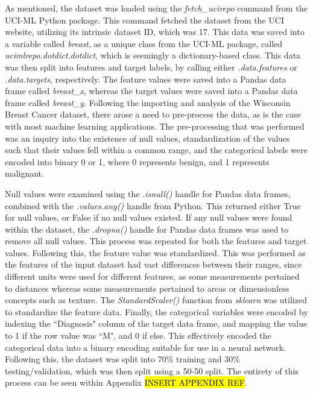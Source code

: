 \documentclass[a4paper]{article}
\begin{document}
As mentioned, the dataset was loaded using the \textit{fetch\_ucirepo} command from the UCI-ML Python package. This command fetched the dataset from the UCI website, utilizing its intrinsic dataset ID, which was 17. This data was saved into a variable called \textit{breast}, as a unique class from the UCI-ML package, called \textit{ucimlrepo.dotdict.dotdict}, which is seemingly a dictionary-based class. This data was then split into features and target labels, by calling either \textit{.data.features} or \textit{.data.targets}, respectively. The feature values were saved into a Pandas data frame called \textit{breast\_x}, whereas the target values were saved into a Pandas data frame called \textit{breast\_y}. Following the importing and analysis of the Wisconsin Breast Cancer dataset, there arose a need to pre-process the data, as is the case with most machine learning applications. The pre-processing that was performed was an inquiry into the existence of null values, standardization of the values such that their values fell within a common range, and the categorical labels were encoded into binary 0 or 1, where 0 represents benign, and 1 represents malignant. 

Null values were examined using the \textit{.isnull()} handle for Pandas data frames, combined with the \textit{.values.any()} handle from Python. This returned either True for null values, or False if no null values existed. If any null values were found within the dataset, the \textit{.dropna()} handle for Pandas data frames was used to remove all null values. This process was repeated for both the features and target values. Following this, the feature value was standardized. This was performed as the features of the input dataset had vast differences between their ranges, since different units were used for different features, as some measurements pertained to distances whereas some measurements pertained to areas or dimensionless concepts such as texture. The \textit{StandardScaler()} function from \textit{sklearn} was utilized to standardize the feature data. Finally, the categorical variables were encoded by indexing the ``Diagnosis" column of the target data frame, and mapping the value to 1 if the row value was ``M", and 0 if else. This effectively encoded the categorical data into a binary encoding suitable for use in a neural network. Following this, the dataset was split into 70\% training and 30\% testing/validation, which was then split using a 50-50 split. The entirety of this process can be seen within Appendix \hl{INSERT APPENDIX REF}.
\end{document}
